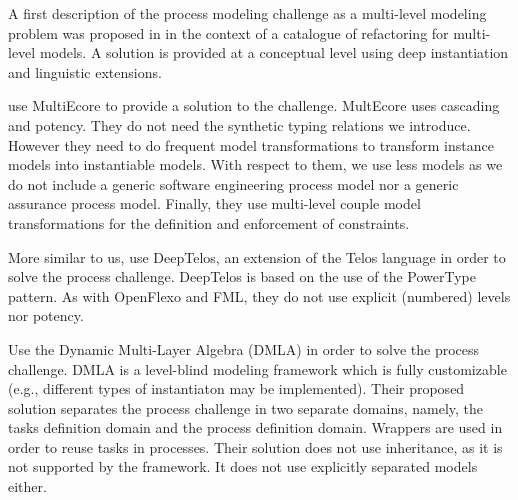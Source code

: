 

A first description of the process modeling challenge as a multi-level modeling problem was proposed in \cite{lara2018refactoring} in the context of a catalogue of refactoring for multi-level models. A solution is provided at a conceptual level using deep instantiation and linguistic extensions.

\cite{multiecore2019} use MultiEcore \citep{multecore2016} to provide a solution to the challenge. MultEcore uses cascading and potency. They do not need the synthetic typing relations we introduce. However they need to do frequent model transformations to transform instance models into instantiable models. With respect to them, we use less models as we do not include a generic software engineering process model nor a generic assurance process model. Finally, they use multi-level couple model transformations for the definition and enforcement of constraints.

More similar to us, \cite{deeptelos2019} use DeepTelos\citep{deeptelos2016}, an extension of the Telos language \citep{telos1990} in order to solve the process challenge. DeepTelos is based on the use of the PowerType \citep{atkinson2001essence} pattern. As with OpenFlexo and FML, they do not use explicit (numbered) levels nor potency.



\cite{dmla2019} Use the Dynamic Multi-Layer Algebra (DMLA)\citep{dmla2017} in order to solve the process challenge. DMLA is a level-blind modeling framework which is fully customizable (e.g., different types of instantiaton may be implemented). Their proposed solution separates the process challenge in two separate domains, namely, the tasks definition domain and the process definition domain. Wrappers are used in order to reuse tasks in processes. Their solution does not use inheritance, as it is not supported by the framework. It does not use explicitly separated models either.


